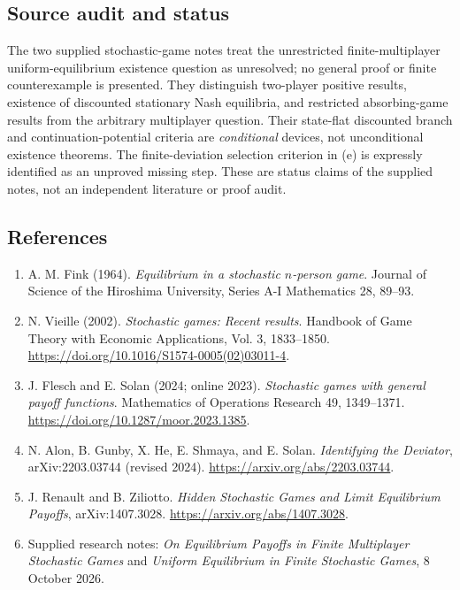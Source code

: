 \documentclass[11pt,a4paper]{article}
\begin{document}
\subsection*{Source audit and status}

The two supplied stochastic-game notes treat the unrestricted
finite-multiplayer uniform-equilibrium existence question as unresolved;
no general proof or finite counterexample is presented. They distinguish
two-player positive results, existence of discounted stationary Nash
equilibria, and restricted absorbing-game results from the arbitrary
multiplayer question. Their state-flat discounted branch and
continuation-potential criteria are \emph{conditional} devices, not
unconditional existence theorems. The finite-deviation selection
criterion in (e) is expressly identified as an unproved missing step.
These are status claims of the supplied notes, not an independent
literature or proof audit.

\subsection*{References}

\begin{enumerate}
	\item[S1] A. M. Fink (1964). \emph{Equilibrium in a stochastic
		$n$-person game}. Journal of Science of the Hiroshima University,
	Series A-I Mathematics 28, 89--93.
	\item[S2] N. Vieille (2002). \emph{Stochastic games: Recent results}.
	Handbook of Game Theory with Economic Applications, Vol. 3,
	1833--1850. \url{https://doi.org/10.1016/S1574-0005(02)03011-4}.
	\item[S3] J. Flesch and E. Solan (2024; online 2023).
	\emph{Stochastic games with general payoff functions}.
	Mathematics of Operations Research 49, 1349--1371.
	\url{https://doi.org/10.1287/moor.2023.1385}.
	\item[S4] N. Alon, B. Gunby, X. He, E. Shmaya, and E. Solan.
	\emph{Identifying the Deviator}, arXiv:2203.03744 (revised 2024).
	\url{https://arxiv.org/abs/2203.03744}.
	\item[S5] J. Renault and B. Ziliotto.
	\emph{Hidden Stochastic Games and Limit Equilibrium Payoffs},
	arXiv:1407.3028. \url{https://arxiv.org/abs/1407.3028}.
	\item[S6] Supplied research notes: \emph{On Equilibrium Payoffs in
		Finite Multiplayer Stochastic Games} and \emph{Uniform Equilibrium
		in Finite Stochastic Games}, 8 October 2026.
\end{enumerate}
\par
\end{document}
